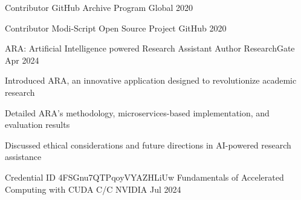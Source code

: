 \documentclass[11pt, a4paper]{awesome-cv}
\begin{document}
\begin{cvhonors}

  \cvhonor
    {Contributor} %
    {GitHub Archive Program} %
    {Global} %
    {2020} %

  \cvhonor
    {Contributor} %
    {Modi-Script Open Source Project} %
    {GitHub} %
    {2020} %

\end{cvhonors}



\begin{cventries}

\cventry
  {ARA: Artificial Intelligence powered Research Assistant}
  {Author}
  {ResearchGate}
  {Apr 2024}
  {
    \begin{cvitems}
      \item {Introduced ARA, an innovative application designed to revolutionize academic research}
      \item {Detailed ARA's methodology, microservices-based implementation, and evaluation results}
      \item {Discussed ethical considerations and future directions in AI-powered research assistance}
    \end{cvitems}
  }

\end{cventries}



\begin{cventries}

\cventry
  {Credential ID 4FSGnu7QTPqoyVYAZHLiUw}
  {Fundamentals of Accelerated Computing with CUDA C/C}
  {NVIDIA}
  {Jul 2024}
  {
    \textbf{}
  }

\end{cventries}
\end{document}
